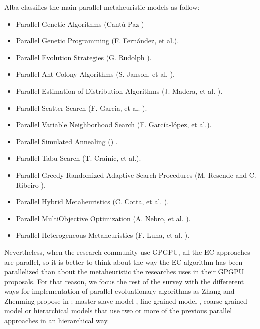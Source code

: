\documentclass[prodmode,acmtecs]{acmsmall}
\begin{document}
Alba classifies the main parallel metaheuristic models as follow:
\begin{itemize}
\item Parallel Genetic Algorithms (Cant\'u Paz \cite{Cantu-Paz98asurvey}) %
\item Parallel Genetic Programming (F. Fernández, et al.\cite{springerlink:10.1023_A:1021873026259}).
\item Parallel Evolution Strategies (G. Rudolph \cite{Rudolph92parallelapproaches}).
\item Parallel Ant Colony Algorithms (S. Janson, et al. \cite{ParallelAntColony}).
\item Parallel Estimation of Distribution Algorithms (J. Madera, et al. \cite{springerlink:10.1007_3_540_32494_1_7}).
\item Parallel Scatter Search (F. Garcia, et al. \cite{GarciaLopez2003575}).
\item Parallel Variable Neighborhood Search (F. Garc\'ia-l\'opez, et al.\cite{Garcia_lopez_theparallel}).
\item Parallel Simulated Annealing (\cite{Genetic_parallelsimulated}) .
\item Parallel Tabu Search (T. Crainic, et al.\cite{Crainic97towardsa}).
\item Parallel Greedy Randomized Adaptive Search Procedures (M. Resende and C. Ribeiro \cite{Resendeparallelgreedy}).
\item Parallel Hybrid Metaheuristics (C. Cotta, et al. \cite{Cotta05e:parallel}). 
\item Parallel MultiObjective Optimization (A. Nebro, et al. \cite{Nebro07mocell:a}).
\item Parallel Heterogeneous Metaheuristics (F. Luna, et al. \cite{ANL04}). 
\end{itemize}

Nevertheless, when the research community use GPGPU, all the EC approaches are parallel, so it is better to think about the way the EC algorithm has been parallelized than about the metaheuristic the researches uses in their GPGPU proposals. For that reason, we focus the rest of the survey with the differerent ways for implementation of parallel evoluationary algorithms as Zhang and Zhenming propose in \cite{ZhangImplementationMasterSlave}: master-slave model \cite{man-leung-wong-parallel-2005}, fine-grained model \cite{jian_ming_li_efficient_2007}, coarse-grained model \cite{Maitre:2009:CGP:1569901_1570089} \cite{pospichalParallelGeneticAlgorithOnCUDA2010} or hierarchical models  \cite{DBLP:conf/gecco/PospichalMOSJ11} that use two or more of the previous parallel approaches in an hierarchical way. 
 
\end{document}
